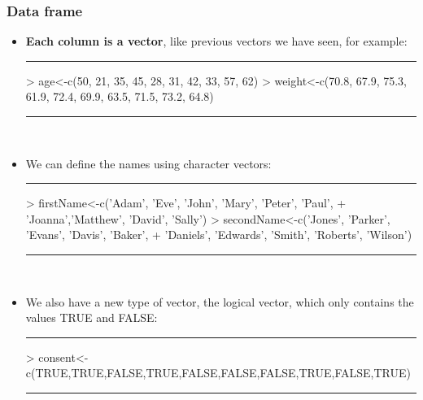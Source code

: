 \documentclass{beamer}
\begin{document}
\begin{frame}[fragile]
	\frametitle{Data frame}
	\begin{itemize}
		\small
		\item \textbf{Each column is a vector}, like previous vectors we have seen, for example:
\rule{\textwidth}{0.4pt}
\scriptsize
\begin{Schunk}
\begin{Sinput}
> age<-c(50, 21, 35, 45, 28, 31, 42, 33, 57, 62)
> weight<-c(70.8, 67.9, 75.3, 61.9, 72.4, 69.9, 63.5, 71.5, 73.2, 64.8)
\end{Sinput}
\end{Schunk}
\rule{\textwidth}{0.4pt}\\
\small
\vspace{10pt}
\pause
		\item We can define the names using character vectors:
\rule{\textwidth}{0.4pt}
\scriptsize
\begin{Schunk}
\begin{Sinput}
> firstName<-c('Adam', 'Eve', 'John', 'Mary', 'Peter', 'Paul', 
+ 	     'Joanna','Matthew', 'David', 'Sally')
> secondName<-c('Jones', 'Parker', 'Evans', 'Davis', 'Baker', 
+ 	       'Daniels', 'Edwards', 'Smith', 'Roberts', 'Wilson')
\end{Sinput}
\end{Schunk}
\rule{\textwidth}{0.4pt}\\
\small
\vspace{10pt}
\pause
		\item We also have a new type of vector, the logical vector, which only contains the values TRUE and FALSE:
\rule{\textwidth}{0.4pt}
\scriptsize
\begin{Schunk}
\begin{Sinput}
> consent<-c(TRUE,TRUE,FALSE,TRUE,FALSE,FALSE,FALSE,TRUE,FALSE,TRUE)
\end{Sinput}
\end{Schunk}
\rule{\textwidth}{0.4pt}\\\end{itemize}
\end{frame}
\end{document}
